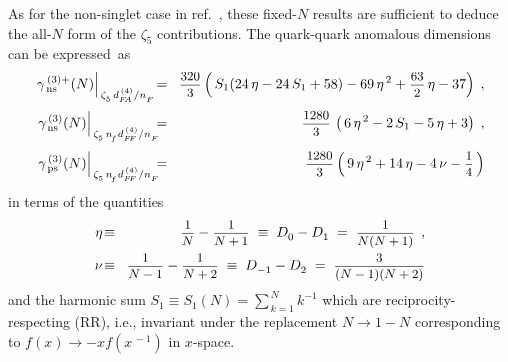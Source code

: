 \documentclass[12pt]{article}
\newcommand{\bea}{\begin{eqnarray}}
\newcommand{\eea}{\end{eqnarray}}
\newcommand{\ra}{\rightarrow}
\def\frct#1#2{\mbox{\small{$\displaystyle\frac{#1}{#2}$}}}
\def\zr#1{{\zeta_{#1}^{}}}
\def\nf{{n^{}_{\! f}}}
\def\DNn#1{D_0^{\:#1}}
\def\DNm#1{D_{-1}^{\:#1}}
\def\DNp#1{D_1^{\:#1}}
\def\DNpp#1{D_2^{\:#1}}
\def\etaD#1{\eta^{\,#1}}
\def\S(#1){{{S}_{#1}}}
\begin{document}
As for the non-singlet case in ref.~\cite{MRUVV1}, these fixed-$N$ results
are sufficient to deduce the all-$N$ form of the $\zeta_5$
contributions. The quark-quark anomalous dimensions can be expressed~as
%
\bea
\label{nsFAz5}
  \left. \gamma_{\,\rm ns}^{\,(3)+}(N)
  \right|_{\,\zr5\,d^{\,(4)}_{F\!A}/n_F^{}} 
  &\!=\!& 
  \frct{320}{3} \* \left(\,
    \S(1) \* ( 24\,\*\eta - 24\,\*\S(1) + 58 )
    - 69 \,\* \etaD2 + \frct{63}{2} \,\* \eta - 37 
  \right)
\; ,
\\[1mm]
\label{nsFFz5}
  \left. \gamma_{\,\rm ns}^{\,(3)}(N)
  \right|_{\,\zr5\,\nf\:\! d^{\,(4)}_{F\!F}/n_F^{}} \!\!
  &\!=\!& 
  \frct{1280}{3} \,\* \left(\,
    6 \,\* \etaD2 - 2 \,\* \S(1) - 5 \,\* \eta + 3
  \right)    
\; ,
\\[1mm]
\label{psFFz5}
  \left. \gamma_{\,\rm ps}^{\,(3)}(N)
  \right|_{\,\zr5\,\nf\:\! d^{\,(4)}_{F\!F}/n_F^{}} \!\!
  &\!=\!& 
  \frct{1280}{3} \* \left(\,
    9 \,\* \etaD2 + 14\,\* \eta - 4 \,\* \nu - \frct{1}{4} 
  \,\right)
\eea
%
in terms of the quantities
%
\bea
\label{etaDef}
  \eta &\!\equiv\!& \frct{1}{N} - \frct{1}{N+1} 
       \;\equiv\; \DNn{} - \DNp{}
       \;=\; \frct{1}{N(N+1)}
\:\: , \\
\label{nuDef}
  \nu &\!\equiv\!& \frct{1}{N-1} - \frct{1}{N+2}
      \;\equiv\; \DNm{} - \DNpp{}
      \;=\; \frct{3}{(N-1)(N+2)}  
\eea
%
and the harmonic sum $\S(1) \equiv \S(1)(N) = \sum_{\,k=1}^{\,N} k^{-1}$
which are reciprocity-respecting (RR), i.e., invariant under the replacement 
$N \ra 1-N$ corresponding to $f(x) \ra -x f(x^{\,-1})$ in $x$-space.
\end{document}
